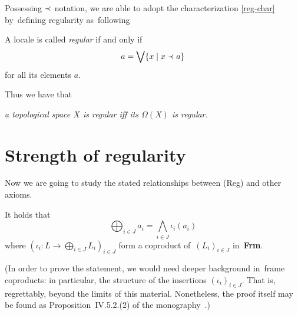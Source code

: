 Possessing $\prec$ notation, we are able to adopt the characterization
\ref{reg-char} by~defining regularity as~following
\begin{framed}
  \begin{df}[Reg]
    A locale is called \emph{regular\/} if and only if
    \[
      a = \bigvee \{x \mid x \prec a\}
    \]
    for all its elements $a$.
  \end{df}
\end{framed}

Thus we have that
\begin{center} 
  \emph{a topological space $X$ is regular iff its $\Omega(X)$ is regular.\/}
\end{center}

\section{Strength of regularity}

Now we are going to study the stated relationships between (Reg) and other
axioms.

\begin{fact}
  It holds that
  \[
    \bigoplus_{i\in J} a_i = \bigwedge_{i\in J} \iota_i(a_i)
  \]
  where $(\iota_i\colon L \to \bigoplus_{i\in J} L_i)_{i\in J}$ form a
  coproduct of~$(L_i)_{i\in J}$ in~{\bf Frm}.
\end{fact}
(In order to prove the statement, we would need deeper background in~frame
coproducts:
in particular, the structure of the insertions $(\iota_i)_{i\in J}$.
That is, regrettably, beyond the limits of this material.
Nonetheless, the proof itself may be found as Proposition~IV.5.2.(2) of the
monography~\cite{picado-pultr12}.)

